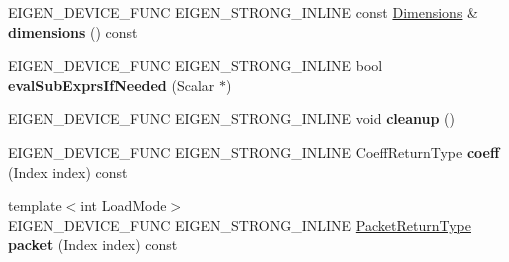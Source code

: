 \begin{DoxyCompactItemize}
\item 
\mbox{\label{struct_eigen_1_1_tensor_evaluator_3_01const_01_tensor_chipping_op_3_01_dim_id_00_01_arg_type_01_4_00_01_device_01_4_a3245e563035a21306ed9a7f37502f103}} 
E\+I\+G\+E\+N\+\_\+\+D\+E\+V\+I\+C\+E\+\_\+\+F\+U\+NC E\+I\+G\+E\+N\+\_\+\+S\+T\+R\+O\+N\+G\+\_\+\+I\+N\+L\+I\+NE const \hyperlink{struct_eigen_1_1_d_sizes}{Dimensions} \& {\bfseries dimensions} () const
\item 
\mbox{\label{struct_eigen_1_1_tensor_evaluator_3_01const_01_tensor_chipping_op_3_01_dim_id_00_01_arg_type_01_4_00_01_device_01_4_a02760aaba16c73de1211d9ca056707c5}} 
E\+I\+G\+E\+N\+\_\+\+D\+E\+V\+I\+C\+E\+\_\+\+F\+U\+NC E\+I\+G\+E\+N\+\_\+\+S\+T\+R\+O\+N\+G\+\_\+\+I\+N\+L\+I\+NE bool {\bfseries eval\+Sub\+Exprs\+If\+Needed} (Scalar $\ast$)
\item 
\mbox{\label{struct_eigen_1_1_tensor_evaluator_3_01const_01_tensor_chipping_op_3_01_dim_id_00_01_arg_type_01_4_00_01_device_01_4_ab039ca215be3299f98ec40414d9a6aca}} 
E\+I\+G\+E\+N\+\_\+\+D\+E\+V\+I\+C\+E\+\_\+\+F\+U\+NC E\+I\+G\+E\+N\+\_\+\+S\+T\+R\+O\+N\+G\+\_\+\+I\+N\+L\+I\+NE void {\bfseries cleanup} ()
\item 
\mbox{\label{struct_eigen_1_1_tensor_evaluator_3_01const_01_tensor_chipping_op_3_01_dim_id_00_01_arg_type_01_4_00_01_device_01_4_a1513b1b7c755d15c98d5b062da9233bf}} 
E\+I\+G\+E\+N\+\_\+\+D\+E\+V\+I\+C\+E\+\_\+\+F\+U\+NC E\+I\+G\+E\+N\+\_\+\+S\+T\+R\+O\+N\+G\+\_\+\+I\+N\+L\+I\+NE Coeff\+Return\+Type {\bfseries coeff} (Index index) const
\item 
\mbox{\label{struct_eigen_1_1_tensor_evaluator_3_01const_01_tensor_chipping_op_3_01_dim_id_00_01_arg_type_01_4_00_01_device_01_4_a00701bf82e76279d03dd35dea48cadd8}} 
{\footnotesize template$<$int Load\+Mode$>$ }\\E\+I\+G\+E\+N\+\_\+\+D\+E\+V\+I\+C\+E\+\_\+\+F\+U\+NC E\+I\+G\+E\+N\+\_\+\+S\+T\+R\+O\+N\+G\+\_\+\+I\+N\+L\+I\+NE \hyperlink{group___sparse_core___module}{Packet\+Return\+Type} {\bfseries packet} (Index index) const

\end{DoxyCompactItemize}
